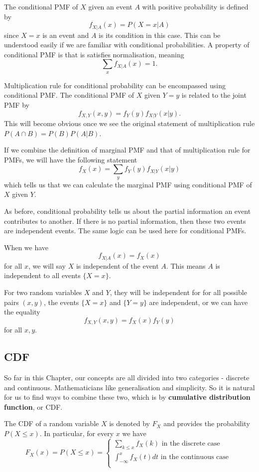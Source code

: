 \documentclass[11pt, a4paper, oneside]{book}
\theoremstyle{definition}
\begin{document}
\noindent The conditional PMF of $X$ given an event $A$ with positive probability is defined by\[
f_{X|A}(x) = P(X=x | A)
\]
since $X=x$ is an event and $A$ is its condition in this case. This can be understood easily if we are familiar with conditional probabilities. A property of conditional PMF is that is satisfies normalisation, meaning\[
\sum_x f_{X|A}(x) = 1.
\]

\noindent Multiplication rule for conditional probability can be encompassed using conditional PMF. The conditional PMF of $X$ given $Y=y$ is related to the joint PMF by\[
f_{X, Y}(x, y) = f_Y(y) f_{X|Y}(x|y).
\]
This will become obvious once we see the original statement of multiplication rule $P(A\cap B) = P(B) P(A|B)$. 

\noindent If we combine the definition of marginal PMF and that of multiplication rule for PMFs, we will have the following statement\[
f_X(x) = \sum_y f_Y(y) f_{X|Y}(x|y)
\]
which tells us that we can calculate the marginal PMF using conditional PMF of $X$ given $Y$. 

\noindent As before, conditional probability tells us about the partial information an event contributes to another. If there is no partial information, then these two events are independent events. The same logic can be used here for conditional PMFs. 

\noindent When we have\[
f_{X|A}(x) = f_{X}(x) 
\]
for all $x$, we will say $X$ is independent of the event $A$. This means $A$ is independent to all events $\{ X = x\}$.

\noindent For two random variables $X$ and $Y$, they will be independent for for all possible pairs $(x,y)$, the events $\{ X = x\}$ and $\{ Y = y\}$ are independent, or we can have the equality\[
f_{X, Y}(x,y) = f_{X}(x) f_{Y}(y) 
\]
for all $x, y$. 

\subsection{CDF}

\noindent So far in this Chapter, our concepts are all divided into two categories - discrete and continuous. Mathematicians like generalisation and simplicity. So it is natural for us to find ways to combine these two, which is by \textbf{cumulative distribution function}, or CDF. 

\noindent The CDF of a random variable $X$ is denoted by $F_X$ and provides the probability $P(X\le x)$. In particular, for every $x$ we have \[
F_X(x) = P(X\le x) =
\begin{cases} 
      \sum_{k \le x} f_X(k) \text{ in the discrete case }\\
      \int_{-\infty}^{x} f_X(t) dt \text{ in the continuous case }\\
\end{cases}
\]
\end{document}
